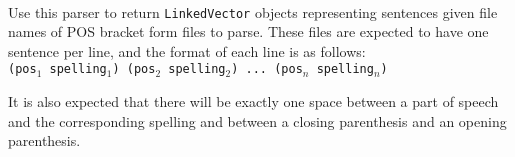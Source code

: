 \begin{list}{}{}
\item[{\tt LBJ2.nlp.POSBracketToVector}:] ~\\
Use this parser to return {\tt LinkedVector} objects representing sentences
given file names of POS bracket form files to parse.  These files are expected
to have one sentence per line, and the format of each line is as follows: \\

\vspace{-.25cm}
{\tt (pos$_1$ spelling$_1$) (pos$_2$ spelling$_2$) ... (pos$_n$ spelling$_n$)}
\\
\vspace{-.25cm}

\noindent
It is also expected that there will be exactly one space between a part of
speech and the corresponding spelling and between a closing parenthesis and an
opening parenthesis.

\end{list}

